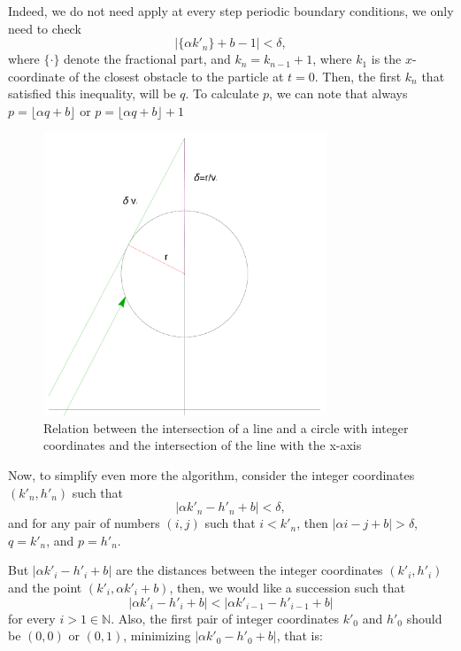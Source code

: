 \documentclass[prl,amsmath,amssymb, twocolumn, showpacs]{revtex4-1}
\begin{document}
Indeed, we do not need apply at every step periodic boundary conditions, we only need to check 
\begin{equation}
|\{ \alpha  k'_n \}+b -1|< \delta, 
\label{eq:master}
\end{equation}
where $\{ \cdot \}$ denote the fractional part, and $k_n=k_{n-1}+1$, where $k_1$ is the $x$-coordinate of the closest obstacle to the particle at $t=0$. Then, the first $k_n$ that satisfied this inequality, will be $q$. To calculate $p$, we can note that always $p=\lfloor \alpha q +b\rfloor$ or $p=\lfloor \alpha q +b\rfloor+1$

\begin{figure}
\centering
\includegraphics [width=240pt]{line-circle.pdf}  %
\caption{Relation between the intersection of a line and a circle with integer coordinates and the intersection of the line with the x-axis}
\label{fig:circle}
\end{figure}


Now, to simplify even more the algorithm, consider the integer coordinates $(k'_n, h'_n)$ such that
\begin{equation}
|\alpha k'_n -h'_n + b|< \delta,
\label{eq:1}
\end{equation}
and for any pair of numbers $(i,j)$ such that $i<k'_n$, then $|\alpha i -j+ b|> \delta$,  $q=k'_n$, and $p=h'_n$. 
 
But $|\alpha k'_i -h'_i + b|$ are the distances between the integer coordinates $(k'_i,h'_i)$ and the point $( k'_i ,\alpha k'_i + b)$, then, we would like a succession such that  
\begin{equation}
|\alpha k'_i -h'_i + b|<|\alpha k'_{i-1} -h'_{i-1} + b|
\label{eq:iteration}
\end{equation}
for every $i>1 \in   \mathbb{N}$. Also, the first pair of integer coordinates $k'_0$ and $h'_0$ should be $(0,0)$ or $(0,1)$, minimizing $|\alpha k'_0 -h'_0 + b|$, that is:
\end{document}
